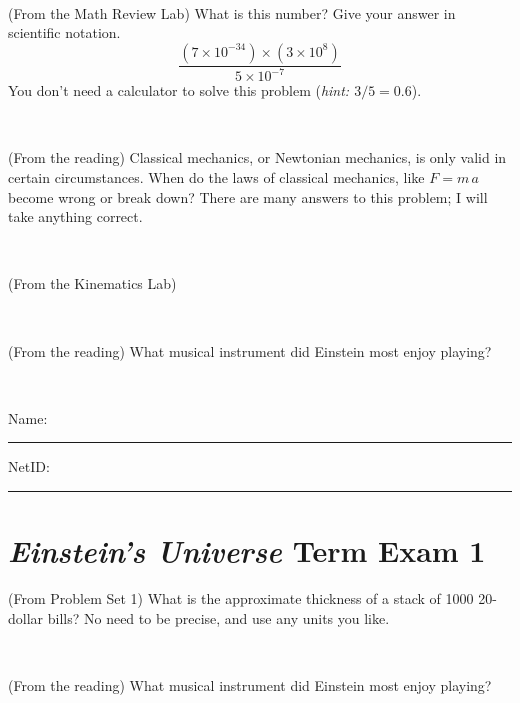 \documentclass[12pt, letterpaper]{article}
\begin{document}
\vfill ~


\clearpage


\begin{problem} (From the Math Review Lab)
What is this number? Give your answer in scientific notation.
$$
\frac{(7\times10^{-34})\times(3\times10^8)}{5\times10^{-7}}
$$
You don't need a calculator to solve this problem (\textit{hint: $3/5=0.6$}).
\end{problem}


\vfill ~

\begin{problem} (From the reading)
Classical mechanics, or Newtonian mechanics, is only valid in certain
circumstances. When do the laws of classical mechanics, like $F =
m\,a$ become wrong or break down? There are many answers to this
problem; I will take anything correct.
\end{problem}


\vfill ~

\begin{problem} (From the Kinematics Lab)

\end{problem}


\vfill ~

\begin{problem} (From the reading)
What musical instrument did Einstein most enjoy playing?
\end{problem}


\vfill ~


\cleardoublepage



\noindent
Name: \rule[-1ex]{0.60\textwidth}{0.1pt}
NetID: \rule[-1ex]{0.20\textwidth}{0.1pt}

\section*{\textsl{Einstein's Universe} Term Exam 1}
\setcounter{problem}{1}


\begin{problem} (From Problem Set 1)
What is the approximate thickness of a stack of 1000 20-dollar bills?
No need to be precise, and use any units you like.
\end{problem}


\vfill ~

\begin{problem} (From the reading)
What musical instrument did Einstein most enjoy playing?
\end{problem}
\end{document}
